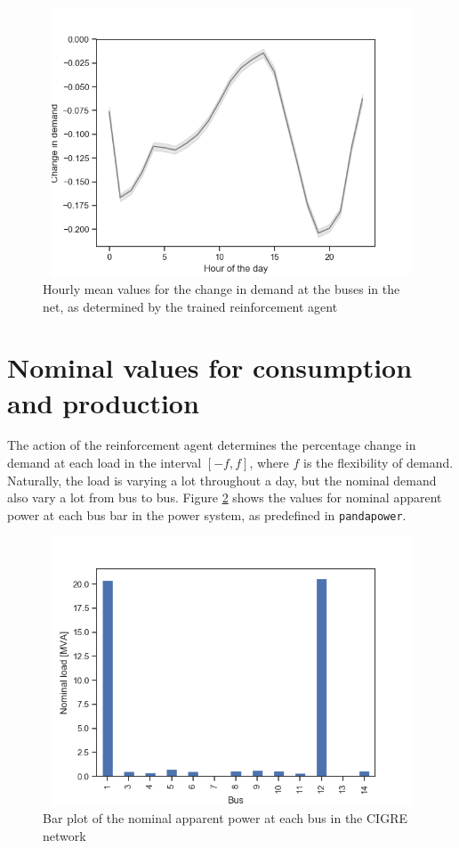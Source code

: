 \documentclass[class=book, crop=false]{standalone}
\begin{document}
\begin{figure}[h]
    \center
\includegraphics[height=8cm, width=12cm]{figures/config1_action_hour.png}
    \caption[size = 9]{Hourly mean values for the change in demand at the buses in the net, as determined by the trained reinforcement agent}
    \label{fig:discussion:config1_action_hour}
\end{figure}


\section{Nominal values for consumption and production}
The action of the reinforcement agent determines the percentage change in demand at each load in the interval $[-f,f]$, where $f$ is the flexibility of demand. Naturally, the load is varying a lot throughout a day, but the nominal demand also vary a lot from bus to bus. Figure \ref{fig:discussion:nominal_load} shows the values for nominal apparent power at each bus bar in the power system, as predefined in \texttt{pandapower}.

\begin{figure}[h]
    \center
\includegraphics[height=8cm, width=12cm]{figures/nominal_load.png}
    \caption[size = 9]{Bar plot of the nominal apparent power at each bus in the CIGRE network}
    \label{fig:discussion:nominal_load}
\end{figure}
\end{document}
